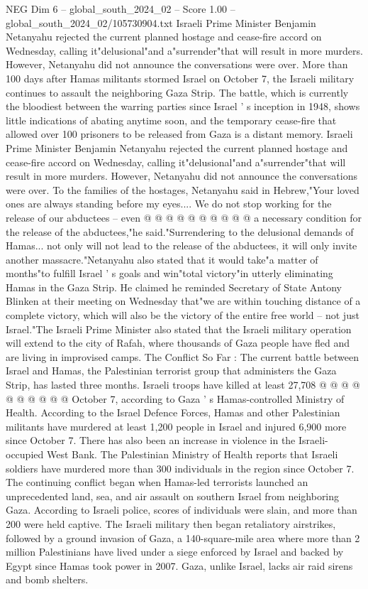 \begin{textsample}{NEG Dim 6 – global\_south\_2024\_02 – Score 1.00 – global\_south\_2024\_02/105730904.txt}  \label{ex:f6_neg_276}
Israeli Prime Minister Benjamin Netanyahu rejected the current planned hostage and cease-fire accord on Wednesday, calling it"delusional"and a"surrender"that will result in more murders.
However, Netanyahu did not announce the conversations were over.
More than 100 days after Hamas militants stormed Israel on October 7, the Israeli military continues to assault the neighboring Gaza Strip.
The battle, which is currently the bloodiest between the warring parties since Israel ' s inception in 1948, shows little indications of abating anytime soon, and the temporary cease-fire that allowed over 100 prisoners to be released from Gaza is a distant memory.
Israeli Prime Minister Benjamin Netanyahu rejected the current planned hostage and cease-fire accord on Wednesday, calling it"delusional"and a"surrender"that will result in more murders.
However, Netanyahu did not announce the conversations were over.
To the families of the hostages, Netanyahu said in Hebrew,"Your loved ones are always standing before my eyes....
We do not stop working for the release of our abductees -- even @ @ @ @ @ @ @ @ @ @ a necessary condition for the release of the abductees,"he said."Surrendering to the delusional demands of Hamas... not only will not lead to the release of the abductees, it will only invite another massacre."Netanyahu also stated that it would take"a matter of months"to fulfill Israel ' s goals and win"total victory"in utterly eliminating Hamas in the Gaza Strip.
He claimed he reminded Secretary of State Antony Blinken at their meeting on Wednesday that"we are within touching distance of a complete victory, which will also be the victory of the entire free world -- not just Israel."The Israeli Prime Minister also stated that the Israeli military operation will extend to the city of Rafah, where thousands of Gaza people have fled and are living in improvised camps.
The Conflict So Far : The current battle between Israel and Hamas, the Palestinian terrorist group that administers the Gaza Strip, has lasted three months.
Israeli troops have killed at least 27,708 @ @ @ @ @ @ @ @ @ @ October 7, according to Gaza ' s Hamas-controlled Ministry of Health.
According to the Israel Defence Forces, Hamas and other Palestinian militants have murdered at least 1,200 people in Israel and injured 6,900 more since October 7.
There has also been an increase in violence in the Israeli-occupied West Bank.
The Palestinian Ministry of Health reports that Israeli soldiers have murdered more than 300 individuals in the region since October 7.
The continuing conflict began when Hamas-led terrorists launched an unprecedented land, sea, and air assault on southern Israel from neighboring Gaza.
According to Israeli police, scores of individuals were slain, and more than 200 were held captive.
The Israeli military then began retaliatory airstrikes, followed by a ground invasion of Gaza, a 140-square-mile area where more than 2 million Palestinians have lived under a siege enforced by Israel and backed by Egypt since Hamas took power in 2007.
Gaza, unlike Israel, lacks air raid sirens and bomb shelters.

\end{textsample}
